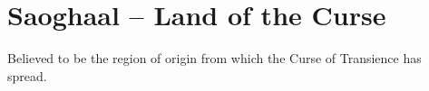 \section{Saoghaal -- Land of the Curse}\label{sec:saoghaal}
Believed to be the region of origin from which the Curse of Transience has spread.







